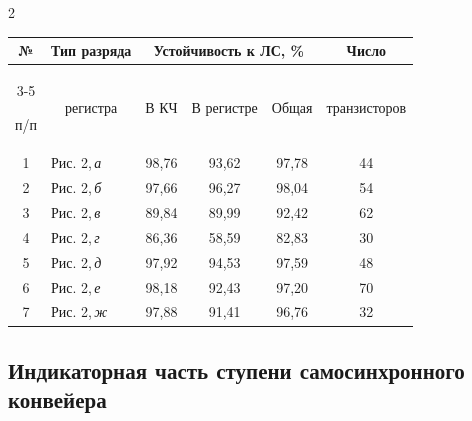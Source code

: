 \begin{multicols}{2}
\begin{table}
\begin{center}
\begin{tabular}{|c|l|c|c|c|c|}
№ &\multicolumn{1}{c|}{Тип разряда} &\multicolumn{3}{c|}{Устойчивость к ЛС, \%}

&Число \\

\cline{3-5}

п/п&\multicolumn{1}{c|}{регистра}&В КЧ&В регистре&Общая&транзисторов\\

\hline

1&\hspace*{10pt}Рис. 2,\,\textit{а}&98,76&93,62&97,78&44\\

2&\hspace*{10pt}Рис. 2,\,\textit{б}&97,66&96,27&98,04&54\\

3&\hspace*{10pt}Рис. 2,\,\textit{в}&89,84&89,99&92,42&62\\

4&\hspace*{10pt}Рис. 2,\,\textit{г}&86,36&58,59&82,83&30\\

5&\hspace*{10pt}Рис. 2,\,\textit{д}&97,92&94,53&97,59&48\\

6&\hspace*{10pt}Рис. 2,\,\textit{е}&98,18&92,43&97,20&70\\

7&\hspace*{10pt}Рис. 2,\,\textit{ж}&97,88&91,41&96,76&32\\

\hline

\end{tabular}

\end{center}

\vspace*{-3pt}

\end{table}



\vspace*{-6pt}



\subsection{Индикаторная часть ступени самосинхронного конвейера}




\end{multicols}

